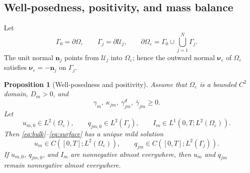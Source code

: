 \documentclass[pdflatex,sn-mathphys-num]{sn-jnl}
\numberwithin{equation}{section}
\theoremstyle{thmstyleone}%
\newtheorem{proposition}[theorem]{Proposition}
\theoremstyle{definition}
\theoremstyle{remark}
\begin{document}
\begin{appendices}

\section{Well-posedness, positivity, and mass balance}
\label{app:wellposedness}

Let
\[
\Gamma_0=\partial\Omega,\qquad
\Gamma_j=\partial\mathcal U_j,\qquad
\partial\Omega_\varepsilon=\Gamma_0\cup\bigcup_{j=1}^N\Gamma_j.
\]
The unit normal $\mathbf n_j$ points from $\mathcal U_j$ into
$\Omega_\varepsilon$; hence the outward normal $\boldsymbol\nu_\varepsilon$
of $\Omega_\varepsilon$ satisfies
$\boldsymbol\nu_\varepsilon=-\mathbf n_j$ on $\Gamma_j$.

\begin{proposition}[Well-posedness and positivity]
\label{prop:bulk_surface_wellposed}
Assume that $\Omega_\varepsilon$ is a bounded $C^2$ domain, $D_m>0$, and
\[
\gamma_m,\ \kappa_{jm},\ \gamma^d_{jm},\ \bar\gamma_{jm}\geq0.
\]
Let
\[
u_{m,0}\in L^2(\Omega_\varepsilon),\qquad
q_{jm,0}\in L^2(\Gamma_j),\qquad
I_m\in L^1\!\left(0,T;L^2(\Omega_\varepsilon)\right).
\]
Then \eqref{eq:bulk}--\eqref{eq:surface} has a unique mild solution
\[
u_m\in C\!\left([0,T];L^2(\Omega_\varepsilon)\right),\qquad
q_{jm}\in C\!\left([0,T];L^2(\Gamma_j)\right).
\]
If $u_{m,0}$, $q_{jm,0}$, and $I_m$ are nonnegative almost everywhere, then
$u_m$ and $q_{jm}$ remain nonnegative almost everywhere.
\end{proposition}


\end{appendices}
\end{document}
